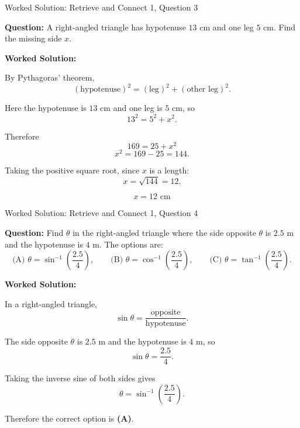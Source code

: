 \documentclass[aspectratio=169]{beamer}
\begin{document}
\begin{frame}{Worked Solution: Retrieve and Connect 1, Question 3}

\textbf{Question:} A right-angled triangle has hypotenuse \(13\) cm and one leg \(5\) cm. Find the missing side \(x\).

\textbf{Worked Solution:}

By Pythagoras' theorem,
\[
(\text{hypotenuse})^2 = (\text{leg})^2 + (\text{other leg})^2.
\]

Here the hypotenuse is \(13\) cm and one leg is \(5\) cm, so
\[
13^2 = 5^2 + x^2.
\]

Therefore
\[
169 = 25 + x^2
\]
\[
x^2 = 169 - 25 = 144.
\]

Taking the positive square root, since \(x\) is a length:
\[
x = \sqrt{144} = 12.
\]

\[
\boxed{x = 12\text{ cm}}
\]

\end{frame}

\begin{frame}{Worked Solution: Retrieve and Connect 1, Question 4}

\textbf{Question:} Find \(\theta\) in the right-angled triangle where the side opposite \(\theta\) is \(2.5\) m and the hypotenuse is \(4\) m. The options are:
\[
\text{(A) } \theta = \sin^{-1}\!\left(\frac{2.5}{4}\right),\qquad
\text{(B) } \theta = \cos^{-1}\!\left(\frac{2.5}{4}\right),\qquad
\text{(C) } \theta = \tan^{-1}\!\left(\frac{2.5}{4}\right).
\]

\textbf{Worked Solution:}

In a right-angled triangle,
\[
\sin\theta = \frac{\text{opposite}}{\text{hypotenuse}}.
\]

The side opposite \(\theta\) is \(2.5\) m and the hypotenuse is \(4\) m, so
\[
\sin\theta = \frac{2.5}{4}.
\]

Taking the inverse sine of both sides gives
\[
\theta = \sin^{-1}\!\left(\frac{2.5}{4}\right).
\]

Therefore the correct option is \textbf{(A)}.

\end{frame}
\end{document}
